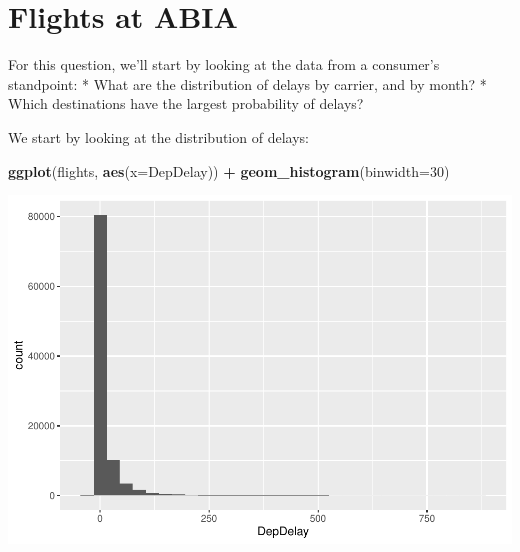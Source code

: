 \documentclass[]{article}
\newenvironment{Shaded}{\begin{snugshade}}{\end{snugshade}}
\newcommand{\DataTypeTok}[1]{\textcolor[rgb]{0.13,0.29,0.53}{#1}}
\newcommand{\DecValTok}[1]{\textcolor[rgb]{0.00,0.00,0.81}{#1}}
\newcommand{\KeywordTok}[1]{\textcolor[rgb]{0.13,0.29,0.53}{\textbf{#1}}}
\newcommand{\NormalTok}[1]{#1}
\newcommand{\OperatorTok}[1]{\textcolor[rgb]{0.81,0.36,0.00}{\textbf{#1}}}
\newcommand{\OtherTok}[1]{\textcolor[rgb]{0.56,0.35,0.01}{#1}}
\newcommand{\StringTok}[1]{\textcolor[rgb]{0.31,0.60,0.02}{#1}}
\begin{document}
\hypertarget{flights-at-abia}{%
\section{Flights at ABIA}\label{flights-at-abia}}

For this question, we'll start by looking at the data from a consumer's
standpoint: * What are the distribution of delays by carrier, and by
month? * Which destinations have the largest probability of delays?

\begin{Shaded}
\end{Shaded}

We start by looking at the distribution of delays:

\begin{Shaded}
\begin{Highlighting}[]
\KeywordTok{ggplot}\NormalTok{(flights, }\KeywordTok{aes}\NormalTok{(}\DataTypeTok{x=}\NormalTok{DepDelay)) }\OperatorTok{+}\StringTok{ }\KeywordTok{geom_histogram}\NormalTok{(}\DataTypeTok{binwidth=}\DecValTok{30}\NormalTok{)}
\end{Highlighting}
\end{Shaded}

\includegraphics{STA380_exercise_George_files/figure-latex/unnamed-chunk-7-1.pdf}
\end{document}
